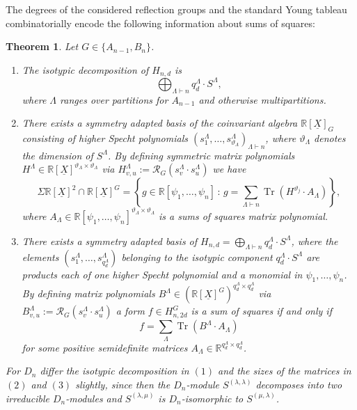 \documentclass[11pt,a4paper]{amsart}
\numberwithin{equation}{section}
\newtheorem{thm}{Theorem}
\theoremstyle{definition}
\newcommand{\R}{\mathbb{R}}
\DeclareMathOperator{\Tr}{Tr}
\numberwithin{thm}{section}
\theoremstyle{break}
\numberwithin{subcase}{case}
\begin{document}
The degrees of the considered reflection groups and the standard Young tableau combinatorially encode the following information about sums  of squares:
\begin{thm}\label{thm:general sums of squares repr}
Let $G \in \{ A_{n-1},B_n\}$.
\begin{enumerate}
    \item The isotypic decomposition of $H_{n,d}$ is $$\bigoplus_{\Lambda \vdash n}q_d^\Lambda \cdot S^{\Lambda},$$ where $\Lambda$ ranges over partitions for $A_{n-1}$ and otherwise multipartitions. 
    
\item There exists a symmetry adapted basis of the coinvariant algebra $\R[\underline{X}]_G$ consisting of higher Specht polynomials $(s_{1}^\Lambda,\ldots,s_{\vartheta_\Lambda}^{\Lambda})_{\Lambda \vdash n}$, where $\vartheta_\Lambda$ denotes the dimension of $S^{\Lambda}$. By defining symmetric matrix polynomials $H^\Lambda \in \R[\underline{X}]^{\vartheta_\Lambda \times \vartheta_\Lambda}$ via $H^\Lambda_{v,u} := \mathcal{R}_G(s_v^\Lambda \cdot s_u^\Lambda)$ we have
$$\Sigma \R[\underline{X}]^2 \cap \R[\underline{X}]^G= \left\{ g\in \R[\psi_1,\ldots,\psi_n]\,:\, g=\sum_{\Lambda \vdash n} \Tr(H^{\vartheta_j}\cdot A_\Lambda)\right\},$$
where $A_\Lambda \in{ \R[\psi_1,\ldots,\psi_n]}^{\vartheta_\Lambda \times \vartheta_\Lambda}$ is a sums of squares matrix polynomial.

\item There exists a symmetry adapted basis of $H_{n,d} = \bigoplus_{\Lambda \vdash n}q_d^\Lambda \cdot S^{\Lambda}$, where the elements $\left(s_{1}^{\Lambda},\ldots,s_{q_d^\Lambda}^\Lambda\right)$ belonging to the isotypic component $q_d^\Lambda \cdot S^{\Lambda}$ are products each of one higher Specht polynomial and a monomial in $\psi_1,\ldots,\psi_n$. By defining matrix polynomials $B^\Lambda \in \left( \R[\underline{X}]^G\right)^{q_d^\Lambda\times q_d^\Lambda}$ via $B^\Lambda_{v,u} := \mathcal{R}_G(s_v^\Lambda \cdot s_u^\Lambda)$ a form $f \in H_{n,2d}^G$ is a sum of squares if and only if $$ f = \sum_\Lambda \Tr(B^{\Lambda} \cdot A_{\Lambda} )$$
for some positive semidefinite matrices $A_{\Lambda} \in \R^{q_d^\Lambda\times q_d^\Lambda}$.
\end{enumerate}
For $D_n$ differ the isotypic decomposition in $(1)$ and the sizes of the matrices in $(2)$ and $(3)$ slightly, since then the $D_n$-module $S^{(\lambda,\lambda)}$ decomposes into two irreducible $D_n$-modules and $S^{(\lambda,\mu)}$ is $D_n$-isomorphic to $S^{(\mu,\lambda)}$. 
\end{thm}
\end{document}
